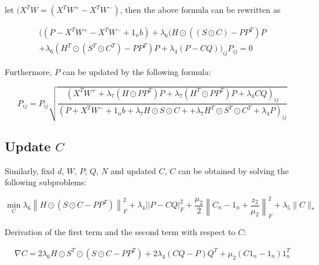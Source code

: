 \documentclass[final,3p,times]{elsarticle}
\begin{document}
let $(X^{T} W=(X^{T} W^{+}-X^{T} W^{-})$, then the above formula can be rewritten as

\begin{equation}
	\begin{array}{l}
		((P-X^{T} W^{+}-X^{T} W^{-}+1_{n} b)+\lambda_{6} (H \odot((S \odot C)-P P^{T}) P\\
		+\lambda_{6} (H^{T} \odot(S^{T} \odot C^{T})-P P^{T}) P+\lambda_{4}(P-CQ))_{ij} P_{ij}=0
	\end{array}
\end{equation}

Furthermore, $P$ can be updated by the following formula:

\begin{equation}
	P_{i j}=P_{i j} \sqrt{\frac{(X^{T} W^{+}+\lambda_{7}\left(H \odot P P^{T}\right) P+\lambda_{7}\left(H^{T} \odot P P^{T}\right) P+\lambda_{4} C Q)_{ij}}{(P+X^{T} W^{-}+1_{n} b+\lambda_{7} H \odot S \odot C++\lambda_{7} H^{T} \odot S^{T} \odot C^{T} +\lambda_{4} P)_{ij}}}
\end{equation}



\subsection{Update $C$}

Similarly, fixd $d$, $W$, $P$, $Q$, $N$ and updated $C$, $C$ can be obtained by solving the following subproblems:

\begin{equation}
	\min _{C} \lambda_{6}\left\|H \odot\left(S \odot C-P P^{T}\right)\right\|_{F}^{2}+\lambda_{4}|| P-\left.C Q\right|_{F} ^{2}+\frac{\mu_{2}}{2}\left\|C_{n}-1_{n}+\frac{z_{2}}{\mu_{2}}\right\|_{F}^{2}
	+\lambda_{5}\|C\|_{*}
\end{equation}

Derivation of the first term and the second term with respect to $C$:

\begin{equation}
	\begin{array}{l}
		\nabla C=2 \lambda_{6} H \odot S^{T} \odot \left(S \odot C-P P^{T}\right)+2 \lambda_{4}(C Q-P) Q^{T} +\mu_{2}\left(C 1_{n}-1_{n}\right) 1_{n}^{T}
	\end{array}
\end{equation}
\end{document}
